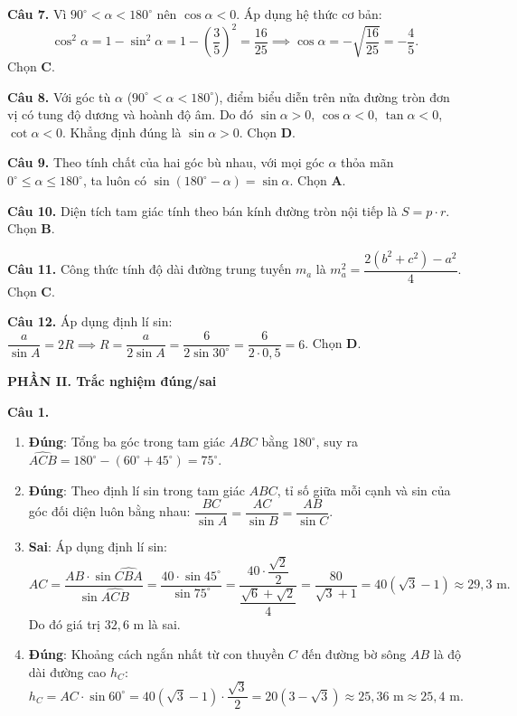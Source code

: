 \documentclass[12pt,a4paper]{article}
\begin{document}
\textbf{Câu 7.} Vì $90^\circ < \alpha < 180^\circ$ nên $\cos \alpha < 0$. Áp dụng hệ thức cơ bản:
\[
\cos^2 \alpha = 1 - \sin^2 \alpha = 1 - \left(\dfrac{3}{5}\right)^2 = \dfrac{16}{25} \implies \cos \alpha = -\sqrt{\dfrac{16}{25}} = -\dfrac{4}{5}.
\]
Chọn \textbf{C}.

\textbf{Câu 8.} Với góc tù $\alpha$ ($90^\circ < \alpha < 180^\circ$), điểm biểu diễn trên nửa đường tròn đơn vị có tung độ dương và hoành độ âm. Do đó $\sin \alpha > 0$, $\cos \alpha < 0$, $\tan \alpha < 0$, $\cot \alpha < 0$. Khẳng định đúng là $\sin \alpha > 0$. Chọn \textbf{D}.

\textbf{Câu 9.} Theo tính chất của hai góc bù nhau, với mọi góc $\alpha$ thỏa mãn $0^\circ \le \alpha \le 180^\circ$, ta luôn có $\sin(180^\circ - \alpha) = \sin \alpha$. Chọn \textbf{A}.

\textbf{Câu 10.} Diện tích tam giác tính theo bán kính đường tròn nội tiếp là $S = p \cdot r$. Chọn \textbf{B}.

\textbf{Câu 11.} Công thức tính độ dài đường trung tuyến $m_a$ là $m_a^2 = \dfrac{2(b^2 + c^2) - a^2}{4}$. Chọn \textbf{C}.

\textbf{Câu 12.} Áp dụng định lí sin: $\dfrac{a}{\sin A} = 2R \implies R = \dfrac{a}{2\sin A} = \dfrac{6}{2\sin 30^\circ} = \dfrac{6}{2 \cdot 0{,}5} = 6$. Chọn \textbf{D}.

\vspace{0.15cm}
\textbf{\large PHẦN II. Trắc nghiệm đúng/sai}

\textbf{Câu 1.}
\begin{enumerate}[itemsep=1.5pt, topsep=1.5pt]
    \item \textbf{Đúng}: Tổng ba góc trong tam giác $ABC$ bằng $180^\circ$, suy ra $\widehat{ACB} = 180^\circ - (60^\circ + 45^\circ) = 75^\circ$.
    \item \textbf{Đúng}: Theo định lí sin trong tam giác $ABC$, tỉ số giữa mỗi cạnh và sin của góc đối diện luôn bằng nhau: $\dfrac{BC}{\sin A} = \dfrac{AC}{\sin B} = \dfrac{AB}{\sin C}$.
    \item \textbf{Sai}: Áp dụng định lí sin:
    \[
    AC = \dfrac{AB \cdot \sin \widehat{CBA}}{\sin \widehat{ACB}} = \dfrac{40 \cdot \sin 45^\circ}{\sin 75^\circ} = \dfrac{40 \cdot \dfrac{\sqrt{2}}{2}}{\dfrac{\sqrt{6}+\sqrt{2}}{4}} = \dfrac{80}{\sqrt{3}+1} = 40(\sqrt{3}-1) \approx 29{,}3\text{ m}.
    \]
    Do đó giá trị $32{,}6\text{ m}$ là sai.
    \item \textbf{Đúng}: Khoảng cách ngắn nhất từ con thuyền $C$ đến đường bờ sông $AB$ là độ dài đường cao $h_C$:
    \[
    h_C = AC \cdot \sin 60^\circ = 40(\sqrt{3}-1) \cdot \dfrac{\sqrt{3}}{2} = 20(3 - \sqrt{3}) \approx 25{,}36\text{ m} \approx 25{,}4\text{ m}.
    \]
\end{enumerate}
\end{document}
